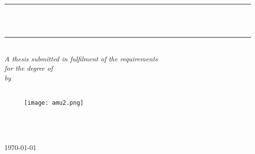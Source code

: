 \documentclass[12pt, a4paper, twoside]{Thesis} %
\title{\ttitle} %
\begin{document}
\makeatletter
\renewcommand*{\NAT@nmfmt}[1]{\textsc{#1}}
\makeatother



\frontmatter %


\fancyhead{} %
\rhead{\thepage} %
\lhead{} %

\pagestyle{fancy} %

\newcommand{\HRule}{\rule{\linewidth}{0.5mm}} %

\hypersetup{pdfsubject=\subjectname}
\hypersetup{pdfauthor=\authornames}
\hypersetup{pdfkeywords=\keywordnames}


\begin{titlepage}
\begin{center}

\HRule \\[0.4cm] %
{\huge \bfseries \ttitle}\\[0.4cm] %
\HRule \\[1.5cm] %
 
\large \textit{A thesis submitted in fulfilment of the requirements\\ for the degree of \degreename}\\[0.4cm] %
\textit{by}\\[0.4cm]
\authornames \\



\vfill
\graphicspath{ {Pictures/} }
\begin{figure}[hb]
  \centering
  \texttt{[image: amu2.png]}
\end{figure}

\DEPTNAME\\ %
\FACNAME\\
\textsc{ \UNIVNAME}\\[1.5cm] %
\large \today\\[2cm] %


\end{center}

\end{titlepage}
\end{document}
